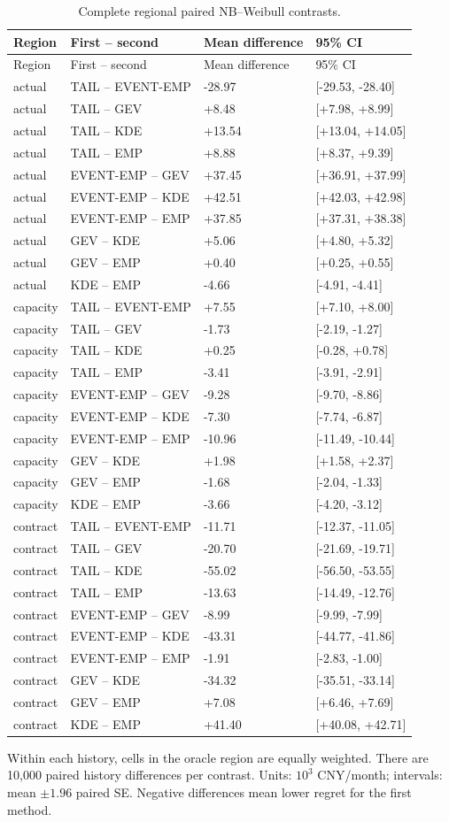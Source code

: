 \begingroup
\fontsize{8.5}{10.5}\selectfont\setlength{\tabcolsep}{3pt}
\begin{longtable}{@{}llll@{}}
\caption{Complete regional paired NB--Weibull contrasts.}\label{tab:final-si-5}\\
\toprule
Region & First -- second & Mean difference & 95\% CI\\\midrule\endfirsthead
Region & First -- second & Mean difference & 95\% CI\\\midrule\endhead
actual & TAIL -- EVENT-EMP & -28.97 & [-29.53, -28.40]\\
actual & TAIL -- GEV & +8.48 & [+7.98, +8.99]\\
actual & TAIL -- KDE & +13.54 & [+13.04, +14.05]\\
actual & TAIL -- EMP & +8.88 & [+8.37, +9.39]\\
actual & EVENT-EMP -- GEV & +37.45 & [+36.91, +37.99]\\
actual & EVENT-EMP -- KDE & +42.51 & [+42.03, +42.98]\\
actual & EVENT-EMP -- EMP & +37.85 & [+37.31, +38.38]\\
actual & GEV -- KDE & +5.06 & [+4.80, +5.32]\\
actual & GEV -- EMP & +0.40 & [+0.25, +0.55]\\
actual & KDE -- EMP & -4.66 & [-4.91, -4.41]\\
capacity & TAIL -- EVENT-EMP & +7.55 & [+7.10, +8.00]\\
capacity & TAIL -- GEV & -1.73 & [-2.19, -1.27]\\
capacity & TAIL -- KDE & +0.25 & [-0.28, +0.78]\\
capacity & TAIL -- EMP & -3.41 & [-3.91, -2.91]\\
capacity & EVENT-EMP -- GEV & -9.28 & [-9.70, -8.86]\\
capacity & EVENT-EMP -- KDE & -7.30 & [-7.74, -6.87]\\
capacity & EVENT-EMP -- EMP & -10.96 & [-11.49, -10.44]\\
capacity & GEV -- KDE & +1.98 & [+1.58, +2.37]\\
capacity & GEV -- EMP & -1.68 & [-2.04, -1.33]\\
capacity & KDE -- EMP & -3.66 & [-4.20, -3.12]\\
contract & TAIL -- EVENT-EMP & -11.71 & [-12.37, -11.05]\\
contract & TAIL -- GEV & -20.70 & [-21.69, -19.71]\\
contract & TAIL -- KDE & -55.02 & [-56.50, -53.55]\\
contract & TAIL -- EMP & -13.63 & [-14.49, -12.76]\\
contract & EVENT-EMP -- GEV & -8.99 & [-9.99, -7.99]\\
contract & EVENT-EMP -- KDE & -43.31 & [-44.77, -41.86]\\
contract & EVENT-EMP -- EMP & -1.91 & [-2.83, -1.00]\\
contract & GEV -- KDE & -34.32 & [-35.51, -33.14]\\
contract & GEV -- EMP & +7.08 & [+6.46, +7.69]\\
contract & KDE -- EMP & +41.40 & [+40.08, +42.71]\\
\bottomrule
\end{longtable}
\noindent\footnotesize Within each history, cells in the oracle region are equally weighted. There are 10,000 paired history differences per contrast. Units: $10^3$ CNY/month; intervals: mean $\pm1.96$ paired SE. Negative differences mean lower regret for the first method.
\endgroup
